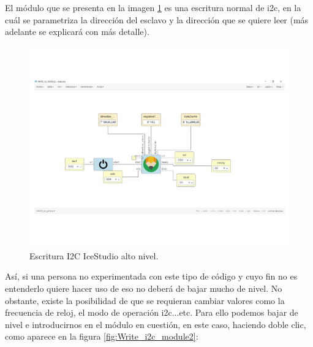 El módulo que se presenta en la imagen \ref{fig:Write_i2c_module} es una escritura normal de i2c, en la cuál se parametriza la dirección del esclavo y la dirección que se quiere leer (más adelante se explicará con más detalle). \newline

\begin{figure}[H]
	\center
	\includegraphics[trim = 0mm 0mm 0mm 0mm, clip,scale=0.4]{imagenes/EstadoArte/Write_i2c_module.pdf}
	\caption{Escritura I2C IceStudio alto nivel.}
	\label{fig:Write_i2c_module}
\end{figure}

Así, si una persona no experimentada con este tipo de código y cuyo fin no es entenderlo quiere hacer uso de eso no deberá de bajar mucho de nivel.\newline
No obstante, existe la posibilidad de que se requieran cambiar valores como la frecuencia de reloj, el modo de operación i2c...etc.
Para ello podemos bajar de nivel e introducirnos en el módulo en cuestión, en este caso, haciendo doble clic, como aparece en la figura \ref{fig:Write_i2c_module2}: 

